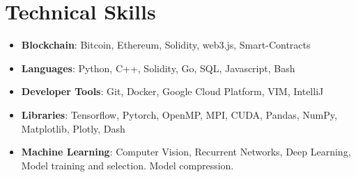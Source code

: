 \documentclass[letterpaper,11pt]{article}
\newcommand{\resumeItem}[1]{
  \item\small{
    {#1 \vspace{-2pt}}
  }
}
\newcommand{\resumeItemListStart}{\begin{itemize}}
\newcommand{\resumeItemListEnd}{\end{itemize}\vspace{-5pt}}
\begin{document}
\section{Technical Skills}
  \resumeItemListStart
    \resumeItem{ \textbf{Blockchain}: Bitcoin, Ethereum, Solidity, web3.js, Smart-Contracts}
    \resumeItem{ \textbf{Languages}: Python, C++, Solidity, Go, SQL, Javascript, Bash}
    \resumeItem{ \textbf{Developer Tools}: Git, Docker, Google Cloud Platform, VIM, IntelliJ}
    \resumeItem{ \textbf{Libraries}: Tensorflow, Pytorch, OpenMP, MPI, CUDA, Pandas, NumPy, Matplotlib, Plotly, Dash}
    \resumeItem{ \textbf{Machine Learning}: Computer Vision, Recurrent Networks, Deep Learning, Model training and selection. Model compression.}
  \resumeItemListEnd


\end{document}
